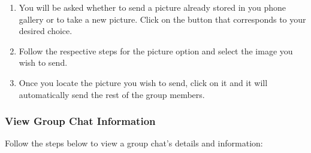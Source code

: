 \documentclass[11pt]{article}
\begin{document}
\begin{enumerate}
\begin{enumerate}
\item You will be asked whether to send a picture already stored in you phone gallery or to take a new picture. Click on the button that corresponds to your desired choice.
\item Follow the respective steps for the picture option and select the image you wish to send.
\item Once you locate the picture you wish to send, click on it and it will automatically send the rest of the group members.
\end{enumerate}
\end{enumerate}

\subsubsection{View Group Chat Information}  \label{info}
Follow the steps below to view a group chat's details and information:
\end{document}
